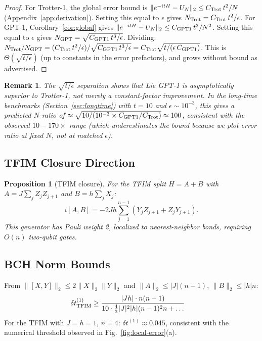 \documentclass[aps,prxquantum,twocolumn,nofootinbib]{revtex4-2}
\newtheorem{proposition}{Proposition}
\newtheorem{remark}{Remark}
\begin{document}
\begin{proof}
  For Trotter-1, the global error bound is
  $\|e^{-itH}-U_N\|_2\leq C_{\rm Trot}\,t^2/N$ (Appendix~\ref{app:derivation}).
  Setting this equal to $\epsilon$ gives
  $N_{\rm Trot}=C_{\rm Trot}\,t^2/\epsilon$.
  For GPT-1, Corollary~\ref{cor:global} gives
  $\|e^{-itH}-U_N\|_2\leq C_{\rm GPT1}\,t^3/N^2$.
  Setting this equal to $\epsilon$ gives
  $N_{\rm GPT}=\sqrt{C_{\rm GPT1}\,t^3/\epsilon}$.
  Dividing:
  $N_{\rm Trot}/N_{\rm GPT}
   = (C_{\rm Trot}\,t^2/\epsilon)/\sqrt{C_{\rm GPT1}\,t^3/\epsilon}
   = C_{\rm Trot}\sqrt{t/(\epsilon\,C_{\rm GPT1})}$.
  This is $\Theta(\sqrt{t/\epsilon})$ (up to constants in the error
  prefactors), and grows without bound as advertised.
\end{proof}

\begin{remark}
  The $\sqrt{t/\epsilon}$ separation shows that Lie GPT-1 is
  \emph{asymptotically superior} to Trotter-1, not merely a
  constant-factor improvement. In the long-time benchmarks
  (Section~\ref{sec:longtime}) with $t=10$ and $\epsilon\sim10^{-3}$,
  this gives a predicted $N$-ratio of
  $\approx\sqrt{10/(10^{-3}\times C_{\rm GPT1}/C_{\rm Trot})}\approx100$,
  consistent with the observed $10-170\times$ range (which underestimates
  the bound because we plot error ratio at fixed $N$, not at matched $\epsilon$).
\end{remark}

\subsection{TFIM Closure Direction}

\begin{proposition}[TFIM closure]
  \label{prop:tfim-closure}
  For the TFIM split $H=A+B$ with $A=J\sum_j Z_jZ_{j+1}$ and
  $B=h\sum_j X_j$:
  \begin{equation}
    i[A,B]
    = -2Jh\sum_{j=1}^{n-1}(Y_jZ_{j+1}+Z_jY_{j+1}).
    \label{eq:tfim-commutator}
  \end{equation}
  This generator has Pauli weight 2, localized to nearest-neighbor
  bonds, requiring $O(n)$ two-qubit gates.
\end{proposition}

\subsection{BCH Norm Bounds}
\label{sec:bchnorms}

From $\|[X,Y]\|_2\leq 2\|X\|_2\|Y\|_2$ and
$\|A\|_2\leq|J|(n-1)$, $\|B\|_2\leq|h|n$:
\begin{align}
  \delta t^{(1)}_{\rm TFIM}
  &\geq \frac{|Jh|\cdot n(n-1)}
    {10\cdot\tfrac{4}{3}|J|^2|h|(n-1)^2n + \ldots}
  \label{eq:tfim-threshold}
\end{align}
For the TFIM with $J=h=1$, $n=4$: $\delta t^{(1)}\approx 0.045$,
consistent with the numerical threshold observed in
Fig.~\ref{fig:local-error}(a).
\end{document}
